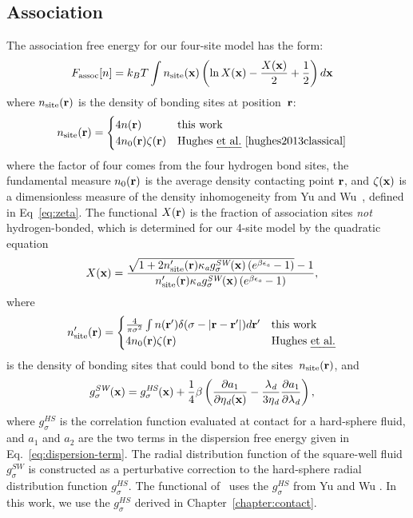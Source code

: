 \subsection{Association}

The association free energy for our four-site model has the form:
\begin{align}
  F_\text{assoc}[n] &= k_BT \int n_\text{site}(\textbf{x})
  \left(\ln X(\textbf{x}) - \frac{X(\textbf{x})}{2} + \frac12\right) d\textbf{x}
\end{align}
where $n_\text{site}(\textbf{r})$ is the density of bonding sites at
position~$\textbf{r}$:
\begin{align}
  n_\text{site}(\rr) &=
  \begin{cases}
    4 n(\rr) & \text{this work}\\
    4 n_0(\rr) \zeta(\rr) & \text{\hughesetalcite}
  \end{cases}
\end{align}
where the factor of four comes from the four hydrogen bond sites, the
fundamental measure $n_0(\textbf{r})$ is the average density contacting point
$\textbf{r}$, and $\zeta(\textbf{x})$ is a dimensionless measure of the density
inhomogeneity from Yu and
Wu~\cite{yu2002fmt-dft-inhomogeneous-associating}, defined in
Eq~\ref{eq:zeta}.  The functional $X(\textbf{r})$ is the fraction of
association sites \emph{not} hydrogen-bonded, which is determined for
our 4-site model by the quadratic equation
\begin{align}
  X(\textbf{x}) &= \frac{\sqrt{1 + 2n_\text{site}'(\textbf{r})
      \kappa_\textit{a} g^\textit{SW}_\sigma(\textbf{x})
  \left(e^{\beta\epsilon_\textit{a}} - 1\right)} - 1}
  {n_\text{site}'(\textbf{r})
    \kappa_\textit{a} g^\textit{SW}_\sigma(\textbf{x})
  \left(e^{\beta\epsilon_\textit{a}} - 1\right)}, \label{eq:X}
\end{align}
where
\begin{align}
  n_\text{site}'(\textbf{r}) &=
  \begin{cases}
    \frac{4}{\pi\sigma^2} \int n(\textbf{r}')\delta(\sigma - |\textbf{r}-\textbf{r}'|) d\textbf{r}' & \text{this work}\\
    4 n_0(\textbf{r}) \zeta(\textbf{r}) & \text{Hughes \emph{et al.}}
  \end{cases}
\end{align}
is the density of bonding sites that could bond to the sites~$n_\text{site}(\textbf{r})$, and
\begin{align}
  g^\textit{SW}_\sigma(\textbf{x}) &= g^\textit{HS}_\sigma(\textbf{x}) +
  \frac{1}{4}\beta\left(\frac{\partial a_1}{\partial \eta_\textit{d}(\textbf{x})} -
  \frac{\lambda_\textit{d}}{3 \eta_\textit{d}}\frac{\partial a_1}{\partial \lambda_\textit{d}}\right)\label{eq:gSW},
\end{align}
where $g^\textit{HS}_\sigma$ is the correlation function evaluated at
contact for a hard-sphere fluid, and $a_1$ and $a_2$ are the two terms
in the dispersion free energy given in Eq.~\ref{eq:dispersion-term}.
The radial distribution function of the square-well fluid
$g^\textit{SW}_\sigma$ is constructed as a perturbative correction to
the hard-sphere radial distribution function $g^\textit{HS}_\sigma$.
The functional of \hughesetal\ uses the $g_\sigma^\textit{HS}$ from Yu
and Wu
\cite{yu2002fmt-dft-inhomogeneous-associating}.  In this work, we use
the $g_\sigma^\textit{HS}$ derived in Chapter~\ref{chapter:contact}.

